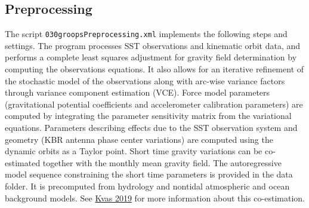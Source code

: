 \subsection{Preprocessing}\label{cookbook.gravityFieldGrace:preprocessing}
The script \verb|030groopsPreprocessing.xml| implements the following steps and settings.
The program  processes SST observations and kinematic orbit data, and
performs a complete least squares adjustment for gravity field determination by computing
the observations equations. It also allows for an iterative refinement of the stochastic model
of the observations along with arc-wise variance factors through variance component estimation (VCE).
Force model parameters (gravitational potential coefficients and accelerometer calibration parameters)
are computed by integrating the parameter sensitivity matrix from the variational equations.
Parameters describing effects due to the SST observation system and geometry (KBR antenna phase
center variations) are computed using the dynamic orbits as a Taylor point.
Short time gravity variations can be co-estimated together with the monthly mean gravity field.
The autoregressive model sequence constraining the short time parameters is provided in the data folder.
It is precomputed from hydrology and nontidal atmospheric and ocean background models.
See \href{https://doi.org/10.1007/s00190-019-01314-1}{Kvas 2019} for more information about
this co-estimation.


